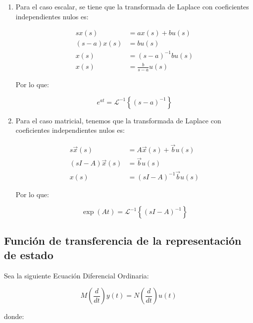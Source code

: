 \begin{enumerate}

\item
Para el caso escalar, se tiene que la transformada de Laplace con coeficientes independientes nulos es:

\begin{align}
s x(s)       & = a x(s) + b u(s) \nonumber\\
(s - a) x(s) & = b u(s) \nonumber\\
x(s)         & = (s - a)^{-1} b u(s) \nonumber\\
x(s)         & = \frac{b}{s - a} u(s) \nonumber
\end{align}

Por lo que:

\begin{equation}
e^{at} = \mathcal{L}^{-1} \left\{ (s - a)^{-1} \right\}
\end{equation}

\item
Para el caso matricial, tenemos que la transformada de Laplace con coeficientes independientes nulos es:

\begin{align}
s \vec{x}(s)         & = A \vec{x}(s) + \vec{b} u(s) \nonumber \\
(s I - A) \vec{x}(s) & = \vec{b} u(s) \nonumber \\
x(s)                 & = (s I - A)^{-1} \vec{b} u(s) \nonumber
\end{align}

Por lo que:

\begin{equation}
\exp{(At)} = \mathcal{L}^{-1} \left\{ (s I - A)^{-1} \right\}
\end{equation}

\end{enumerate}

\subsection{Función de transferencia de la representación de estado}

Sea la siguiente Ecuación Diferencial Ordinaria:

\begin{equation}
M \left( \frac{d}{dt} \right) y(t) = N \left( \frac{d}{dt} \right) u(t) \nonumber
\end{equation}

donde:

